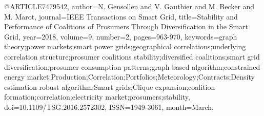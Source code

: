 @ARTICLE{7479542, 
author={N. {Gensollen} and V. {Gauthier} and M. {Becker} and M. {Marot}}, 
journal={IEEE Transactions on Smart Grid}, 
title={Stability and Performance of Coalitions of Prosumers Through Diversification in the Smart Grid}, 
year={2018}, 
volume={9}, 
number={2}, 
pages={963-970}, 
keywords={graph theory;power markets;smart power grids;geographical correlations;underlying correlation structure;prosumer coalitions stability;diversified coalitions;smart grid diversification;prosumer consumption patterns;graph-based algorithm;constrained energy market;Production;Correlation;Portfolios;Meteorology;Contracts;Density estimation robust algorithm;Smart grids;Clique expansion;coalition formation;correlation;electricity market;prosumers;stability}, 
doi={10.1109/TSG.2016.2572302}, 
ISSN={1949-3061}, 
month={March},}
